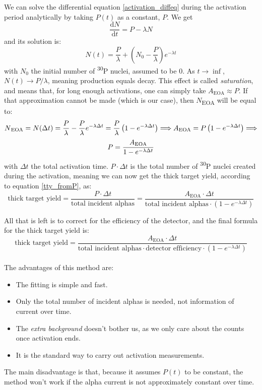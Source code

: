 \documentclass[a4paper,12pt]{report}
\newcommand{\dif}{\text{d}}
\newcommand{\ddt}[1]{\frac{\dif #1}{\dif t}}
\newcommand{\Piso}{\textsuperscript{30}P }
\begin{document}
We can solve the differential equation \ref{activation_diffeq} during the activation period analytically by taking $P(t)$ as a constant, $P$.
We get
\begin{equation}
	\ddt{N} = P -\lambda N
\end{equation}
and its solution is:
\begin{equation}
	N(t) = \frac{P}{\lambda} + \left(  N_0 - \frac{P}{\lambda}  \right) e^{-\lambda t}
	\label{activation_constantP_solution}
\end{equation}
with $N_0$ the initial number of \Piso nuclei, assumed to be \num{0}.
As $t\longrightarrow\inf$, $N(t)\longrightarrow P/\lambda$, meaning production equals decay.
This effect is called \textit{saturation}, and means that, for long enough activations, one can simply take $A_\text{EOA}\approx P$.
If that approximation cannot be made (which is our case), then $N$\textsubscript{EOA} will be equal to:
\[ N\textsubscript{EOA} =N(\Delta t) = \frac{P}{\lambda} - \frac{P}{\lambda} e^{-\lambda \Delta t} = \frac{P}{\lambda} \left(1 - e^{-\lambda \Delta t} \right)\Longrightarrow A\textsubscript{EOA}=P\left(1-e^{-\lambda\Delta t}\right)\Longrightarrow \]
\begin{equation}
	P = \frac{A\textsubscript{EOA}}{1 - e^{-\lambda \Delta t}}
\end{equation}
with $\Delta t$ the total activation time.
$P\cdot\Delta t$ is the total number of \Piso nuclei created during the activation, meaning we can now get the thick target yield, according to equation \ref{tty_fromP}, as:
\begin{equation}
	\text{thick target yield} = \frac{P\cdot \Delta t}{\text{total incident alphas}} = \frac{A_\text{EOA}\cdot \Delta t}{\text{total incident alphas} \cdot \left( 1-e^{-\lambda \Delta t}  \right)}
\end{equation}

All that is left is to correct for the efficiency of the detector, and the final formula for the thick target yield is:
\begin{equation}
	\text{thick target yield} = \frac{A_\text{EOA}\cdot\Delta t}{\text{total incident alphas} \cdot \text{detector efficiency} \cdot \left(1 - e^{-\lambda \Delta t} \right)}	%
\end{equation}
\\

The advantages of this method are:
\begin{itemize}
	\item The fitting is simple and fast.
	\item Only the total number of incident alphas is needed, not information of current over time.
	\item The \textit{extra background} doesn't bother us, as we only care about the counts once activation ends.
	\item It is the standard way to carry out activation measurements.
\end{itemize}
The main disadvantage is that, because it assumes $P(t)$ to be constant, the method won't work if the alpha current is not approximately constant over time.
\end{document}
